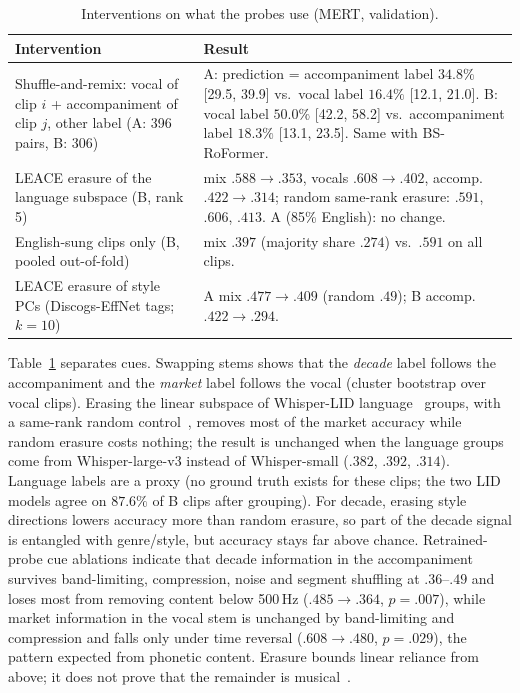 \documentclass[10pt,twocolumn]{article}
\begin{document}
\begin{table}[t]\centering\small
\caption{Interventions on what the probes use (MERT, validation).}\label{tab:interv}
\begin{tabular}{@{}p{3.1cm}p{4.2cm}@{}}\toprule
Intervention & Result\\\midrule
Shuffle-and-remix: vocal of clip $i$ + accompaniment of clip $j$, other label (A: 396 pairs, B: 306)
& A: prediction = accompaniment label $34.8\%$ [29.5, 39.9] vs.\ vocal label $16.4\%$ [12.1, 21.0]. B: vocal label $50.0\%$ [42.2, 58.2] vs.\ accompaniment label $18.3\%$ [13.1, 23.5]. Same with BS-RoFormer.\\
LEACE erasure of the language subspace (B, rank 5) & mix $.588\to.353$, vocals $.608\to.402$, accomp. $.422\to.314$; random same-rank erasure: $.591$, $.606$, $.413$. A (85\% English): no change.\\
English-sung clips only (B, pooled out-of-fold) & mix $.397$ (majority share $.274$) vs.\ $.591$ on all clips.\\
LEACE erasure of style PCs (Discogs-EffNet tags; $k{=}10$) & A mix $.477\to.409$ (random $.49$); B accomp.\ $.422\to.294$.\\\bottomrule
\end{tabular}
\end{table}

Table~\ref{tab:interv} separates cues. Swapping stems shows that the \emph{decade} label follows the accompaniment and the \emph{market} label follows the vocal (cluster bootstrap over vocal clips). Erasing the linear subspace of Whisper-LID language~\cite{radford2022whisper} groups, with a same-rank random control~\cite{belrose2023leace}, removes most of the market accuracy while random erasure costs nothing; the result is unchanged when the language groups come from Whisper-large-v3 instead of Whisper-small ($.382$, $.392$, $.314$). Language labels are a proxy (no ground truth exists for these clips; the two LID models agree on $87.6\%$ of B clips after grouping). For decade, erasing style directions lowers accuracy more than random erasure, so part of the decade signal is entangled with genre/style, but accuracy stays far above chance. Retrained-probe cue ablations indicate that decade information in the accompaniment survives band-limiting, compression, noise and segment shuffling at $.36$--$.49$ and loses most from removing content below 500\,Hz ($.485\to.364$, $p{=}.007$), while market information in the vocal stem is unchanged by band-limiting and compression and falls only under time reversal ($.608\to.480$, $p{=}.029$), the pattern expected from phonetic content. Erasure bounds linear reliance from above; it does not prove that the remainder is musical~\cite{belrose2023leace}.
\end{document}

